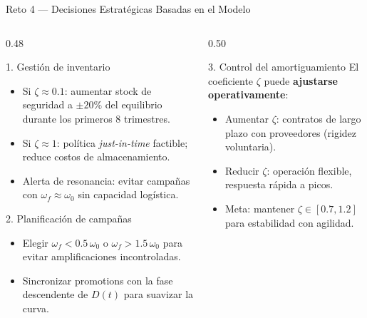 \documentclass[10pt,aspectratio=169]{beamer}
\begin{document}
\begin{frame}{Reto 4 — Decisiones Estratégicas Basadas en el Modelo}
  \begin{columns}[T]
    \begin{column}{0.48\textwidth}
      \begin{block}{1. Gestión de inventario}
        \small
        \begin{itemize}
          \item Si $\zeta \approx 0.1$: aumentar stock de seguridad
                a $\pm20\%$ del equilibrio durante los primeros
                8 trimestres.
          \item Si $\zeta \approx 1$: política \emph{just-in-time}
                factible; reduce costos de almacenamiento.
          \item Alerta de resonancia: evitar campañas con
                $\omega_f \approx \omega_0$ sin capacidad logística.
        \end{itemize}
      \end{block}
      \vspace{4pt}
      \begin{block}{2. Planificación de campañas}
        \small
        \begin{itemize}
          \item Elegir $\omega_f < 0.5\,\omega_0$ o $\omega_f > 1.5\,\omega_0$
                para evitar amplificaciones incontroladas.
          \item Sincronizar promotions con la fase descendente
                de $D(t)$ para suavizar la curva.
        \end{itemize}
      \end{block}
    \end{column}
    \begin{column}{0.50\textwidth}
      \begin{block}{3. Control del amortiguamiento}
        \small
        El coeficiente $\zeta$ puede \textbf{ajustarse operativamente}:
        \begin{itemize}
          \item Aumentar $\zeta$: contratos de largo plazo con
                proveedores (rigidez voluntaria).
          \item Reducir $\zeta$: operación flexible, respuesta
                rápida a picos.
          \item Meta: mantener $\zeta \in [0.7, 1.2]$ para
                estabilidad con agilidad.
        \end{itemize}

\end{block}
\end{column}
\end{columns}
\end{frame}
\end{document}
